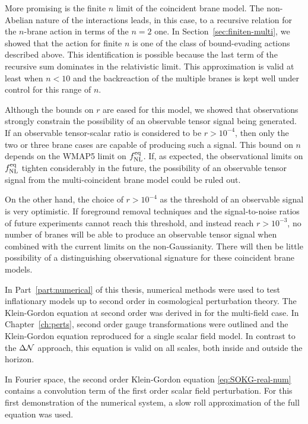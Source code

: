 More promising is the finite $n$ limit of the coincident brane model. The
non-Abelian nature of the interactions leads, in this case, to a recursive relation for
the $n$-brane action in terms of the $n=2$ one. In
Section~\ref{sec:finiten-multi}, we showed that the action for finite $n$ is one of
the class of bound-evading actions described above. This identification is possible
because the last term of the recursive sum dominates in the relativistic limit. This
approximation is valid at least when $n<10$ and the backreaction of the multiple
branes is kept well under control for this range of $n$.

Although the bounds on $r$ are eased
for this model, we showed that observations strongly constrain the possibility of
an observable tensor signal being generated. If an observable tensor-scalar ratio is
considered to be $r>10^{-4}$, then only the two or three brane cases are capable of
producing such a signal. This bound on $n$ depends on the WMAP5 limit on $f_{\mathrm{NL}}^{\mathrm{eq}}$.
If, as expected, the observational limits on $f_{\mathrm{NL}}^{\mathrm{eq}}$ tighten considerably in the
future, the possibility of an observable tensor signal from the multi-coincident
brane model could be ruled out.

On the other hand, the choice of $r>10^{-4}$ as the threshold of an observable signal is very
optimistic. If foreground removal techniques and the signal-to-noise ratios of future experiments
cannot reach this threshold, and instead reach $r>10^{-3}$, no number of branes will be able to
produce an observable tensor signal when combined with the current limits on the non-Gaussianity.
There will then be little possibility of a distinguishing
observational signature for these coincident brane models.

In Part~\ref{part:numerical} of this thesis, numerical methods were used to test inflationary
models up to second order in cosmological perturbation theory. 
% 
% 
The Klein-Gordon equation at second order was derived in  for the
multi-field case. 
In Chapter~\ref{ch:perts}, second order gauge transformations were outlined
and the Klein-Gordon equation reproduced for a single scalar field model. In contrast
to the $\Delta \mathcal{N}$ approach, this equation is valid on all scales, both inside and
outside the horizon. 


In Fourier space, the second order Klein-Gordon equation \eqref{eq:SOKG-real-num} contains a
convolution term of the first order scalar field perturbation. For this first
demonstration of the numerical system, a slow roll approximation of the full
equation was used. 


